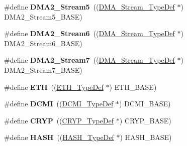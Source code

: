 \begin{DoxyCompactItemize}
\item 
\#define {\bfseries D\+M\+A2\+\_\+\+Stream5}~((\hyperlink{struct_d_m_a___stream___type_def}{D\+M\+A\+\_\+\+Stream\+\_\+\+Type\+Def} $\ast$) D\+M\+A2\+\_\+\+Stream5\+\_\+\+B\+A\+SE)\hypertarget{group___peripheral__declaration_gac40f58718761251875b5a897287efd83}{}\label{group___peripheral__declaration_gac40f58718761251875b5a897287efd83}

\item 
\#define {\bfseries D\+M\+A2\+\_\+\+Stream6}~((\hyperlink{struct_d_m_a___stream___type_def}{D\+M\+A\+\_\+\+Stream\+\_\+\+Type\+Def} $\ast$) D\+M\+A2\+\_\+\+Stream6\+\_\+\+B\+A\+SE)\hypertarget{group___peripheral__declaration_ga11a00b283e0911cd427e277e5a314ccc}{}\label{group___peripheral__declaration_ga11a00b283e0911cd427e277e5a314ccc}

\item 
\#define {\bfseries D\+M\+A2\+\_\+\+Stream7}~((\hyperlink{struct_d_m_a___stream___type_def}{D\+M\+A\+\_\+\+Stream\+\_\+\+Type\+Def} $\ast$) D\+M\+A2\+\_\+\+Stream7\+\_\+\+B\+A\+SE)\hypertarget{group___peripheral__declaration_gacc135dbca0eca67d5aa0abc555f053ce}{}\label{group___peripheral__declaration_gacc135dbca0eca67d5aa0abc555f053ce}

\item 
\#define {\bfseries E\+TH}~((\hyperlink{struct_e_t_h___type_def}{E\+T\+H\+\_\+\+Type\+Def} $\ast$) E\+T\+H\+\_\+\+B\+A\+SE)\hypertarget{group___peripheral__declaration_ga3a3f60de4318afbd0b3318e7a416aadc}{}\label{group___peripheral__declaration_ga3a3f60de4318afbd0b3318e7a416aadc}

\item 
\#define {\bfseries D\+C\+MI}~((\hyperlink{struct_d_c_m_i___type_def}{D\+C\+M\+I\+\_\+\+Type\+Def} $\ast$) D\+C\+M\+I\+\_\+\+B\+A\+SE)\hypertarget{group___peripheral__declaration_ga049d9f61cb078d642e68f3c22bb6d90c}{}\label{group___peripheral__declaration_ga049d9f61cb078d642e68f3c22bb6d90c}

\item 
\#define {\bfseries C\+R\+YP}~((\hyperlink{struct_c_r_y_p___type_def}{C\+R\+Y\+P\+\_\+\+Type\+Def} $\ast$) C\+R\+Y\+P\+\_\+\+B\+A\+SE)\hypertarget{group___peripheral__declaration_gaf8c417168aefe66429b5f1b6adc9effa}{}\label{group___peripheral__declaration_gaf8c417168aefe66429b5f1b6adc9effa}

\item 
\#define {\bfseries H\+A\+SH}~((\hyperlink{struct_h_a_s_h___type_def}{H\+A\+S\+H\+\_\+\+Type\+Def} $\ast$) H\+A\+S\+H\+\_\+\+B\+A\+SE)\hypertarget{group___peripheral__declaration_ga7172fe24d1ffc31d15b20a77ea9f34dd}{}\label{group___peripheral__declaration_ga7172fe24d1ffc31d15b20a77ea9f34dd}


\end{DoxyCompactItemize}
